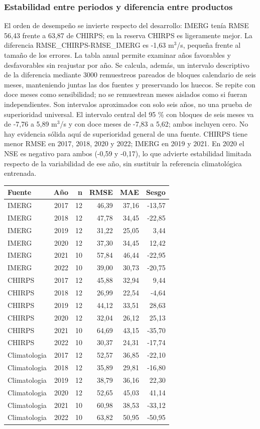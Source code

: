 \documentclass[10pt,a4paper]{article}
\begin{document}
\subsubsection*{Estabilidad entre periodos y diferencia entre productos}
El orden de desempeño se invierte respecto del desarrollo: IMERG tenía RMSE 56,43 frente a 63,87 de CHIRPS; en la reserva CHIRPS es ligeramente mejor. La diferencia RMSE\_CHIRPS-RMSE\_IMERG es -1,63 m$^3$/s, pequeña frente al tamaño de los errores. La tabla anual permite examinar años favorables y desfavorables sin reajustar por año. Se calcula, además, un intervalo descriptivo de la diferencia mediante 3000 remuestreos pareados de bloques calendario de seis meses, manteniendo juntas las dos fuentes y preservando los huecos. Se repite con doce meses como sensibilidad; no se remuestrean meses aislados como si fueran independientes. Son intervalos aproximados con solo seis años, no una prueba de superioridad universal. El intervalo central del 95 \% con bloques de seis meses va de -7,76 a 5,89 m$^3$/s y con doce meses de -7,83 a 5,62; ambos incluyen cero. No hay evidencia sólida aquí de superioridad general de una fuente. CHIRPS tiene menor RMSE en 2017, 2018, 2020 y 2022; IMERG en 2019 y 2021. En 2020 el NSE es negativo para ambos (-0,59 y -0,17), lo que advierte estabilidad limitada respecto de la variabilidad de ese año, sin sustituir la referencia climatológica entrenada.
\begin{center}\small\begin{tabular}{lrrrrr}\hline
Fuente & Año & n & RMSE & MAE & Sesgo \\ \hline
IMERG & 2017 & 12 & 46,39 & 37,16 & -13,57 \\
IMERG & 2018 & 12 & 47,78 & 34,45 & -22,85 \\
IMERG & 2019 & 12 & 31,22 & 25,05 & 3,44 \\
IMERG & 2020 & 12 & 37,30 & 34,45 & 12,42 \\
IMERG & 2021 & 10 & 57,84 & 46,44 & -22,95 \\
IMERG & 2022 & 10 & 39,00 & 30,73 & -20,75 \\
CHIRPS & 2017 & 12 & 45,88 & 32,94 & 9,44 \\
CHIRPS & 2018 & 12 & 26,99 & 22,54 & -4,64 \\
CHIRPS & 2019 & 12 & 44,12 & 33,51 & 28,63 \\
CHIRPS & 2020 & 12 & 32,04 & 26,12 & 25,13 \\
CHIRPS & 2021 & 10 & 64,69 & 43,15 & -35,70 \\
CHIRPS & 2022 & 10 & 30,37 & 24,31 & -17,74 \\
Climatologia & 2017 & 12 & 52,57 & 36,85 & -22,10 \\
Climatologia & 2018 & 12 & 35,89 & 29,81 & -16,80 \\
Climatologia & 2019 & 12 & 38,79 & 36,16 & 22,30 \\
Climatologia & 2020 & 12 & 52,65 & 45,03 & 41,14 \\
Climatologia & 2021 & 10 & 60,98 & 38,53 & -33,12 \\
Climatologia & 2022 & 10 & 63,82 & 50,95 & -50,95 \\
\hline\end{tabular}\end{center}
\end{document}
